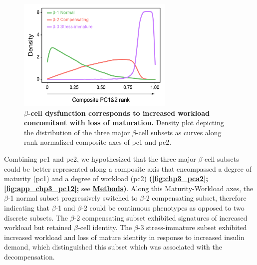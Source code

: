 \begin{figure}
\vspace{-20pt}
\includegraphics[width=7.5cm]{Chapter5/Fig/F3-6-04.png}
\caption[$\beta$-cell dysfunction corresponds to increased workload and loss of maturation]{\textbf{$\beta$-cell dysfunction corresponds to increased workload concomitant with loss of maturation.}  Density plot depicting the distribution of the three major $\beta$-cell subsets as curves along rank normalized composite axes of \gls{pc}1 and \gls{pc}2.}
\label{fig:chp3_pca2}
\vspace{-20pt}
\end{figure}

\par Combining \gls{pc}1 and \gls{pc}2, we hypothesized that the three major $\beta$-cell subsets could be better represented along a composite axis that encompassed a degree of maturity (\gls{pc}1) and a degree of workload (\gls{pc}2) \textbf{(\autoref{fig:chp3_pca2}; \autoref{fig:app_chp3_pc12};} see \hyperref[subsubsec:met_chp3_pca]{\textbf{Methods}}\textbf{)}. Along this Maturity-Workload axes, the $\beta$-1 normal subset progressively switched to $\beta$-2 compensating subset, therefore indicating that $\beta$-1 and $\beta$-2 could be continuous phenotypes as opposed to two discrete subsets. The $\beta$-2 compensating subset exhibited signatures of increased workload but retained $\beta$-cell identity. The $\beta$-3 stress-immature subset exhibited increased workload and loss of mature identity in response to increased insulin demand, which distinguished this subset which was associated with the decompensation.\\



